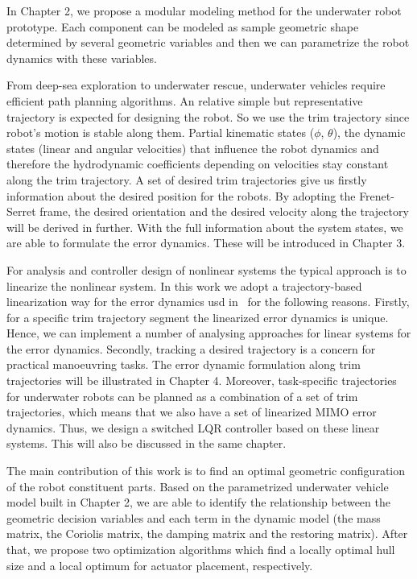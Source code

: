In Chapter 2, we propose a modular modeling method for the underwater robot prototype. Each component can be modeled as sample geometric shape determined by several geometric variables and then we can parametrize the robot dynamics with these variables. 

From deep-sea exploration to underwater rescue, underwater vehicles require efficient path planning algorithms. An relative simple but representative trajectory is expected for designing the robot. So we use the trim trajectory since robot's motion is stable along them. Partial kinematic states ($\phi$, $\theta$), the dynamic states (linear and angular velocities) that influence the robot dynamics and therefore the hydrodynamic coefficients depending on velocities stay constant along the trim trajectory. A set of desired trim trajectories give us firstly information about the desired position for the robots. By adopting the Frenet-Serret frame, the desired orientation and the desired velocity along the trajectory will be derived in further. With the full information about the system states, we are able to formulate the error dynamics. These will be introduced in Chapter 3. 

For analysis and controller design of nonlinear systems the typical approach is to linearize the nonlinear system. In this work we adopt a trajectory-based linearization way for the error dynamics usd in~\cite{Silvestre2002} for the following reasons. Firstly, for a specific trim trajectory segment the linearized error dynamics is unique. Hence, we can implement a number of analysing approaches for linear systems for the error dynamics. Secondly, tracking a desired trajectory is a concern for practical manoeuvring tasks. The error dynamic formulation along trim trajectories will be illustrated in Chapter 4. Moreover, task-specific trajectories for underwater robots can be planned as a combination of a set of trim trajectories, which means that we also have a set of linearized MIMO error dynamics. Thus, we design a switched LQR controller based on these linear systems. This will also be discussed in the same chapter.    

The main contribution of this work is to find an optimal geometric configuration of the robot constituent parts. Based on the parametrized underwater vehicle model built in Chapter 2, we are able to identify the relationship between the geometric decision variables and each term in the dynamic model (the mass matrix, the Coriolis matrix, the damping matrix and the restoring matrix). After that, we propose two optimization algorithms which find a locally optimal hull size and a local optimum for actuator placement, respectively.

